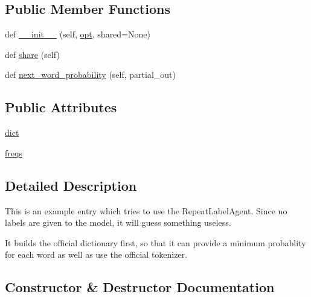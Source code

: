 \subsection*{Public Member Functions}
\begin{DoxyCompactItemize}
\item 
def \hyperlink{classprojects_1_1convai2_1_1eval__ppl_1_1WordFrequencyEntry_a3dfd58c2bf262228339cf3728b6b0caa}{\+\_\+\+\_\+init\+\_\+\+\_\+} (self, \hyperlink{classparlai_1_1core_1_1agents_1_1Agent_ab3b45d2754244608c75d4068b90cd051}{opt}, shared=None)
\item 
def \hyperlink{classprojects_1_1convai2_1_1eval__ppl_1_1WordFrequencyEntry_a5abf8443347e45742e911d441a8b9c10}{share} (self)
\item 
def \hyperlink{classprojects_1_1convai2_1_1eval__ppl_1_1WordFrequencyEntry_abc7d4ea01f82e42e8a18794e620de005}{next\+\_\+word\+\_\+probability} (self, partial\+\_\+out)
\end{DoxyCompactItemize}
\subsection*{Public Attributes}
\begin{DoxyCompactItemize}
\item 
\hyperlink{classprojects_1_1convai2_1_1eval__ppl_1_1WordFrequencyEntry_af518e0d344e66f8ec7eede1bb6359e7e}{dict}
\item 
\hyperlink{classprojects_1_1convai2_1_1eval__ppl_1_1WordFrequencyEntry_a63fd68257eda4fc1560e4b58f858312c}{freqs}
\end{DoxyCompactItemize}


\subsection{Detailed Description}
\begin{DoxyVerb}This is an example entry which tries to use the RepeatLabelAgent. Since no labels
are given to the model, it will guess something useless.

It builds the official dictionary first, so that it can provide a minimum probablity
for each word as well as use the official tokenizer.
\end{DoxyVerb}
 

\subsection{Constructor \& Destructor Documentation}
\mbox{\label{classprojects_1_1convai2_1_1eval__ppl_1_1WordFrequencyEntry_a3dfd58c2bf262228339cf3728b6b0caa}} 
